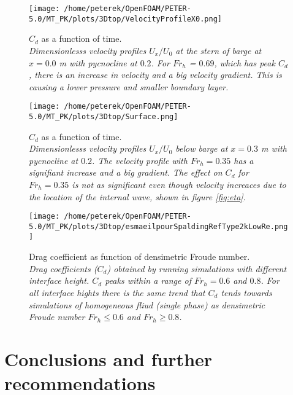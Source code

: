 \documentclass[a4paper, 12pt]{report}
\begin{document}
\begin{minipage}[t]{.45\textwidth}
	\begin{figure}[H]
		\centering
		\texttt{[image: /home/peterek/OpenFOAM/PETER-5.0/MT\_PK/plots/3Dtop/VelocityProfileX0.png]}
		\caption{$C_d$ as a function of time. \\ \textit{Dimensionlesss velocity profiles $U_x/U_0$ at the stern of barge at $x = 0.0$ m with pycnocline at $ 0.2$. For $Fr_h$ = $0.69$, which has peak $C_d$, there is an increase in velocity and a big velocity gradient. This is causing a lower pressure and smaller boundary layer.}}
		\label{fig:convTestIf02U016}
	\end{figure}
\end{minipage}\hfill
\vspace{2ex}
\begin{minipage}[t]{.45\textwidth} 
	\begin{figure}[H]
		\centering
		\texttt{[image: /home/peterek/OpenFOAM/PETER-5.0/MT\_PK/plots/3Dtop/Surface.png]}
		\caption{$C_d$ as a function of time. \\ \textit{Dimensionlesss velocity profiles $U_x/U_0$ below barge at $x = 0.3$ m with pycnocline at $ 0.2$. The velocity profile with $Fr_h = 0.35$ has a signifiant increase and a big gradient. The effect on $C_d$ for $Fr_h = 0.35$ is not as significant even though velocity increaces due to the location of the internal wave, shown in figure \ref{fig:eta}.  }}
		\label{fig:convTestIf02U022}
	\end{figure}
\end{minipage}\hfill
\vspace{2ex}

\begin{figure}[H]
	\centering
	\texttt{[image: /home/peterek/OpenFOAM/PETER-5.0/MT\_PK/plots/3Dtop/esmaeilpourSpaldingRefType2kLowRe.png]}
	\caption{Drag coefficient as function of densimetric Froude number. \\ \textit{Drag coefficients ($C_d$) obtained by running simulations with different interface height. $C_d$ peaks within a range of $Fr_h = 0.6$ and $0.8$. For all interface hights there is the same trend that $C_d$ tends towards simulations of homogeneous fliud (single phase) as densimetric Froude number $Fr_h \leq 0.6$ and $Fr_h \geq 0.8$.}}
	\label{fig:Cd}
\end{figure}

\chapter{Conclusions and further recommendations}
\end{document}
